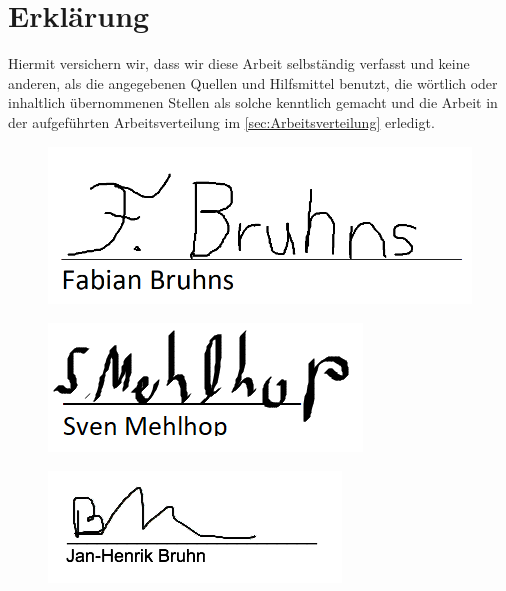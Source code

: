 \section{Erklärung}

Hiermit versichern wir, dass wir diese Arbeit selbständig verfasst und keine anderen, als die angegebenen Quellen und Hilfsmittel benutzt, die wörtlich oder inhaltlich übernommenen Stellen als solche kenntlich gemacht und die Arbeit in der aufgeführten Arbeitsverteilung im \autoref{sec:Arbeitsverteilung} erledigt. \\[2ex] 

\noindent
\begin{minipage}{0.33\textwidth}
	\begin{figure}[H]
			\includegraphics[scale=0.35]{Anhang/UnterschriftFabian.png}
	\end{figure}
\end{minipage}
\begin{minipage}{0.33\textwidth}
	\begin{figure}[H]
		\includegraphics[scale=0.9]{Anhang/Unterschriften.png}%
	\end{figure}
\end{minipage}
\begin{minipage}{0.33\textwidth}
	\begin{figure}[H]
		\includegraphics[scale=0.6]{Anhang/UnterschriftJean.png}
	\end{figure}
\end{minipage}

